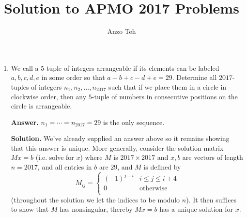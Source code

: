 \documentclass[11pt,a4paper]{article}
\begin{document}
\newcommand{\la}{\leftarrow}
\newcommand{\lra}{\leftrightarrow}
\newcommand{\bbN}{\mathbb{N}}
\newcommand{\bbZ}{\mathbb{Z}}
\newcommand{\dsum}{\displaystyle\sum}
\newcommand{\dprod}{\displaystyle\prod}


\title{Solution to APMO 2017 Problems}
\author{Anzo Teh}
\date{}
\maketitle

\begin{enumerate}
	\item We call a $5$-tuple of integers arrangeable if its elements can be labeled $a, b, c, d, e$ in some order so that $a-b+c-d+e=29$. Determine all $2017$-tuples of integers $n_1, n_2, . . . , n_{2017}$ such that if we place them in a circle in clockwise order, then any $5$-tuple of numbers in consecutive positions on the circle is arrangeable.
	
	\textbf{Answer.} $n_1=\cdots = n_{2017}=29$ is the only sequence. 
	
	\textbf{Solution.} We've already supplied an answer above so it remains showing that this answer is unique. More generally, consider the solution matrix $Mx=b$ (i.e. solve for $x$) where $M$ is $2017\times 2017$ and $x, b$ are vectors of length $n=2017$, and all entries in $b$ are $29$, and $M$ is defined by 
	\[
	M_{ij}=
	\begin{cases}
		(-1)^{j-i} & i\le j\le i+4\\
		0 & \text{otherwise}\\
	\end{cases}
	\]
	(throughout the solution we let the indices to be modulo $n$). It then suffices to show that $M$ has nonsingular, thereby $Mx=b$ has a unique solution for $x$. 
	

\end{enumerate}
\end{document}
